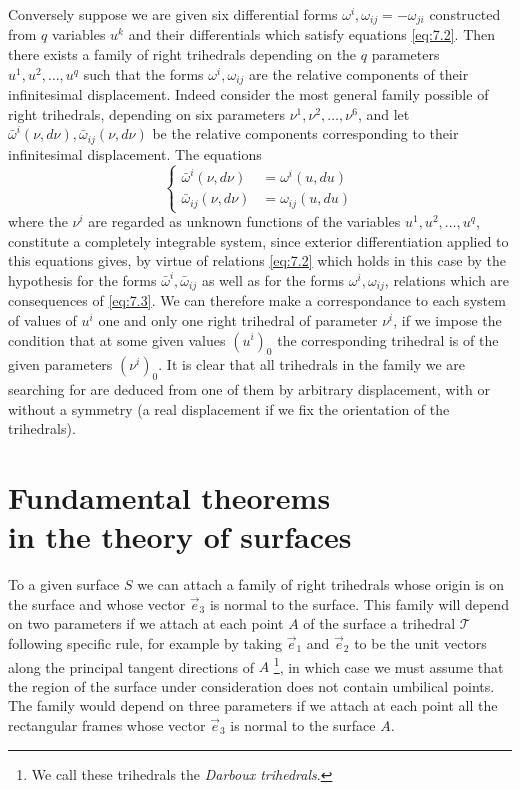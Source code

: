 \documentclass[leqno,11pt]{book}
\numberwithin{equation}{chapter}
\theoremstyle{shape1}
\theoremstyle{shape0}
\theoremstyle{shape2}
\theoremstyle{definition}
\begin{document}
\vspace{12pt}\fsec Conversely suppose we are given six differential forms $\omega^{i},\omega_{ij}=-\omega_{ji}$ constructed from $q$ variables $u^{k}$ and their differentials which satisfy equations \eqref{eq:7.2}. Then there exists a family of right trihedrals depending on the $q$ parameters $u^{1},u^{2},\dots,u^{q}$ such that the forms $\omega^{i},\omega_{ij}$ are the relative components of their infinitesimal displacement. Indeed consider the most general family possible of right trihedrals, depending on six parameters $\nu^{1},\nu^{2},\dots,\nu^{6}$, and let $\bar \omega^{i}(\nu,d\nu),\bar\omega_{ij}(\nu,d\nu)$ be the relative components corresponding to their infinitesimal displacement. The equations
\begin{equation}
  \label{eq:7.3}
  \left\{
    \begin{aligned}
    \bar\omega^{i}(\nu,d\nu)&=\omega^{i}(u,du)\\
    \bar\omega_{ij}(\nu,d\nu)&=\omega_{ij}(u,du)    
    \end{aligned}
  \right.
\end{equation}
where the $\nu^{i}$ are regarded as unknown functions of the variables $u^{1},u^{2},\dots,u^{q}$, constitute a completely integrable system, since exterior differentiation applied to this equations gives, by virtue of relations \eqref{eq:7.2} which holds in this case by the hypothesis for the forms $\bar\omega^{i},\bar\omega_{ij}$ as well as for the forms $\omega^{i},\omega_{ij}$, relations which are consequences of \eqref{eq:7.3}. We can therefore make a correspondance to each system of values of $u^{i}$ one and only one right trihedral of parameter $\nu^{i}$, if we impose the condition that at some given values $(u^{i})_{0}$ the corresponding trihedral is of the given parameters $(\nu^{i})_{0}$. It is clear that all trihedrals in the family we are searching for are deduced from one of them by arbitrary displacement, with or without a symmetry (a real displacement if we fix the orientation of the trihedrals).

\section[{Fundamental theorems in the theory of surfaces}]{Fundamental theorems\\in the theory of surfaces}
\label{sec:fund-theor-theory}

\fsec To a given surface $S$ we can attach a family of right trihedrals whose origin is on the surface and whose  vector $\vec e_{3}$ is normal to the surface. This family will depend on two parameters if we attach at each point $A$ of the surface a trihedral $\mathcal{T}$ following specific rule, for example by taking $\vec e_{1}$ and $\vec e_{2}$ to be the unit vectors along the principal tangent directions of $A$ \footnote{We call these trihedrals the \emph{Darboux trihedrals}.},  in which case we must assume that the region of the surface under consideration does not contain umbilical points. The family would depend on three parameters if we attach at each point all the rectangular frames whose vector $\vec e_{3}$ is normal to the surface $A$.
\end{document}
